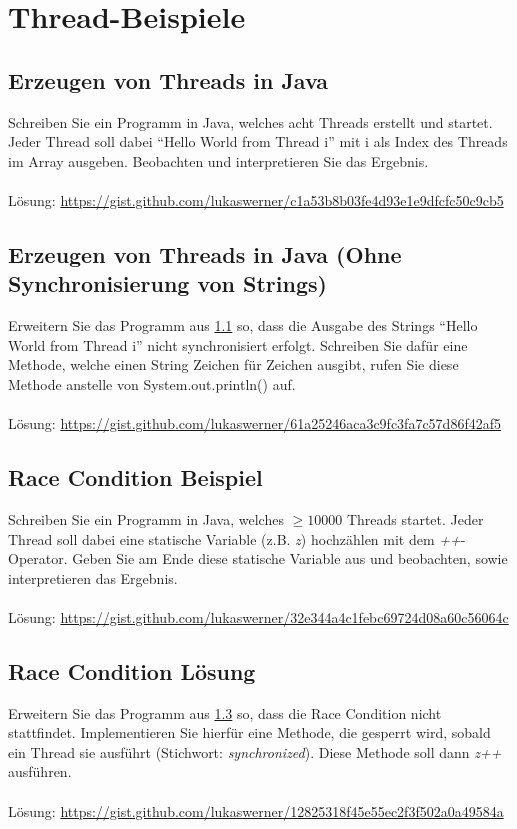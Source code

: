 \documentclass[a4paper]{scrartcl}
\begin{document}
\section{Thread-Beispiele}

\subsection{Erzeugen von Threads in Java}\label{javathreads}
Schreiben Sie ein Programm in Java, welches acht Threads erstellt und startet. Jeder Thread soll dabei "`Hello World from Thread i"' mit i als Index des Threads im Array ausgeben. Beobachten und interpretieren Sie das Ergebnis.\\
\\
Lösung: \url{https://gist.github.com/lukaswerner/c1a53b8b03fe4d93e1e9dfcfc50c9cb5}

\subsection{Erzeugen von Threads in Java (Ohne Synchronisierung von Strings)}
Erweitern Sie das Programm aus \ref{javathreads} so, dass die Ausgabe des Strings "`Hello World from Thread i"' nicht synchronisiert erfolgt. Schreiben Sie dafür eine Methode, welche einen String Zeichen für Zeichen ausgibt, rufen Sie diese Methode anstelle von System.out.println() auf.\\
\\
Lösung: \url{https://gist.github.com/lukaswerner/61a25246aca3c9fc3fa7c57d86f42af5}

\subsection{Race Condition Beispiel}\label{racecondition}
Schreiben Sie ein Programm in Java, welches $ \geq 10000 $ Threads startet. Jeder Thread soll dabei eine statische Variable (z.B. \emph{z}) hochzählen mit dem \emph{++}-Operator. Geben Sie am Ende diese statische Variable aus und beobachten, sowie interpretieren das Ergebnis.\\
\\
Lösung: \url{https://gist.github.com/lukaswerner/32e344a4c1febc69724d08a60c56064c}

\subsection{Race Condition Lösung}
Erweitern Sie das Programm aus \ref{racecondition} so, dass die Race Condition nicht stattfindet. Implementieren Sie hierfür eine Methode, die gesperrt wird, sobald ein Thread sie ausführt (Stichwort: \emph{synchronized}). Diese Methode soll dann \emph{z++} ausführen.\\
\\
Lösung: \url{https://gist.github.com/lukaswerner/12825318f45e55ec2f3f502a0a49584a}
\end{document}
